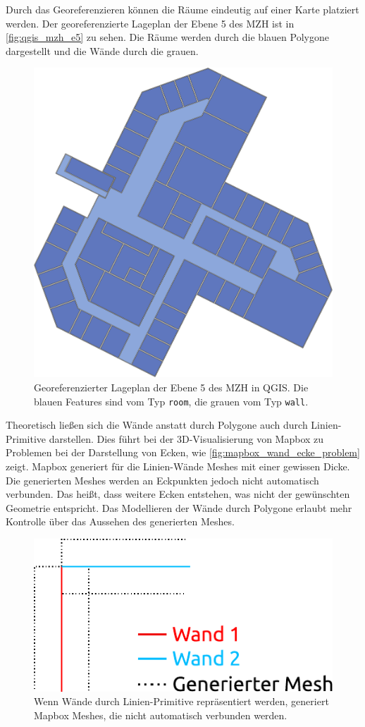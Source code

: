 Durch das Georeferenzieren können die Räume eindeutig auf einer Karte platziert werden.
Der georeferenzierte Lageplan der Ebene 5 des MZH ist in \autoref{fig:qgis_mzh_e5} zu sehen.
Die Räume werden durch die blauen Polygone dargestellt und die Wände durch die grauen.

\begin{figure}[b]
    \centering
    \includegraphics[width=0.3\linewidth]{figures/qgis_mzh_e5}
    \caption{Georeferenzierter Lageplan der Ebene 5 des MZH in QGIS.\@ %
    Die blauen Features sind vom Typ \texttt{room}, die grauen vom Typ \texttt{wall}.}
    \label{fig:qgis_mzh_e5}
\end{figure}

Theoretisch ließen sich die Wände anstatt durch Polygone auch durch Linien-Primitive darstellen.
Dies führt bei der 3D-Visualisierung von Mapbox zu Problemen bei der Darstellung von Ecken, wie \autoref{fig:mapbox_wand_ecke_problem} zeigt.
Mapbox generiert für die Linien-Wände Meshes mit einer gewissen Dicke.
Die generierten Meshes werden an Eckpunkten jedoch nicht automatisch verbunden.
Das heißt, dass weitere Ecken entstehen, was nicht der gewünschten Geometrie entspricht.
Das Modellieren der Wände durch Polygone erlaubt mehr Kontrolle über das Aussehen des generierten Meshes.

\begin{figure}[t]
    \centering
    \includegraphics[width=0.6\linewidth]{figures/mapbox_wand_ecke_problem}
    \vspace{2em}
    \caption{Wenn Wände durch Linien-Primitive repräsentiert werden, generiert Mapbox Meshes, die nicht automatisch verbunden werden.}
    \label{fig:mapbox_wand_ecke_problem}
\end{figure}

